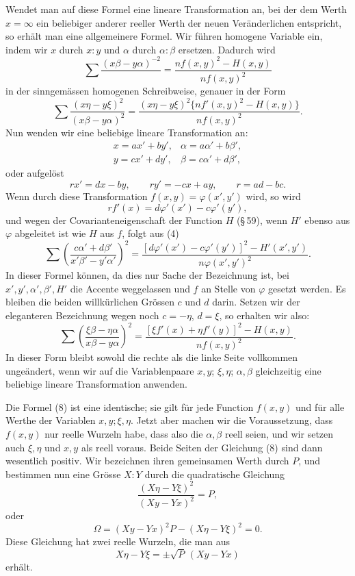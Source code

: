 \documentclass[11pt]{article}
\begin{document}
Wendet man auf diese Formel eine lineare Transformation an, bei der dem Werth $x=\infty$ ein beliebiger anderer reeller Werth der neuen Veränderlichen entspricht, so erhält man eine allgemeinere Formel. Wir führen homogene Variable ein, indem wir $x$ durch $x:y$ und $\alpha$ durch $\alpha:\beta$ ersetzen. Dadurch wird
\begin{equation}
        \sum \frac{(x\beta-y\alpha)^{-2}}{\ }=
        \frac{n f(x,y)^2-H(x,y)}{n f(x,y)^2}
\tag{4}
\end{equation}
in der sinngemässen homogenen Schreibweise, genauer in der Form
\[
        \sum \frac{(x\eta-y\xi)^2}{(x\beta-y\alpha)^2}
        =
        \frac{(x\eta-y\xi)^2\{n f'(x,y)^2-H(x,y)\}}{n f(x,y)^2}.
\]
Nun wenden wir eine beliebige lineare Transformation an:
\begin{equation}
\begin{array}{ll}
x=ax'+by',& \alpha=a\alpha'+b\beta',\\
y=cx'+dy',& \beta=c\alpha'+d\beta',
\end{array}
\tag{5}
\end{equation}
oder aufgelöst
\[
        rx'=dx-by,\qquad ry'=-cx+ay,\qquad r=ad-bc.
\]
Wenn durch diese Transformation $f(x,y)=\varphi(x',y')$ wird, so wird
\[
        r f'(x)=d\varphi'(x')-c\varphi'(y'),
\]
und wegen der Covarianteneigenschaft der Function $H$ (\S\,59), wenn $H'$ ebenso aus $\varphi$ abgeleitet ist wie $H$ aus $f$, folgt aus (4)
\[
 \sum\left(
        \frac{c\alpha'+d\beta'}{x'\beta'-y'\alpha'}
      \right)^2
 =
 \frac{[d\varphi'(x')-c\varphi'(y')]^2-H'(x',y')}{n\varphi(x',y')^2}.
\tag{6}
\]
In dieser Formel können, da dies nur Sache der Bezeichnung ist, bei $x',y',\alpha',\beta',H'$ die Accente weggelassen und $f$ an Stelle von $\varphi$ gesetzt werden. Es bleiben die beiden willkürlichen Grössen $c$ und $d$ darin. Setzen wir der eleganteren Bezeichnung wegen noch $c=-\eta$, $d=\xi$, so erhalten wir also:
\begin{equation}
        \sum\left(
        \frac{\xi\beta-\eta\alpha}{x\beta-y\alpha}
        \right)^2
        =
        \frac{[\xi f'(x)+\eta f'(y)]^2-H(x,y)}{n f(x,y)^2}.
\tag{8}
\end{equation}
In dieser Form bleibt sowohl die rechte als die linke Seite vollkommen ungeändert, wenn wir auf die Variablenpaare $x,y$; $\xi,\eta$; $\alpha,\beta$ gleichzeitig eine beliebige lineare Transformation anwenden.

Die Formel (8) ist eine identische; sie gilt für jede Function $f(x,y)$ und für alle Werthe der Variablen $x,y;\xi,\eta$. Jetzt aber machen wir die Voraussetzung, dass $f(x,y)$ nur reelle Wurzeln habe, dass also die $\alpha,\beta$ reell seien, und wir setzen auch $\xi,\eta$ und $x,y$ als reell voraus. Beide Seiten der Gleichung (8) sind dann wesentlich positiv. Wir bezeichnen ihren gemeinsamen Werth durch $P$, und bestimmen nun eine Grösse $X:Y$ durch die quadratische Gleichung
\[
        \frac{(X\eta-Y\xi)^2}{(Xy-Yx)^2}=P,
\]
oder
\begin{equation}
        \Omega=(Xy-Yx)^2P-(X\eta-Y\xi)^2=0.
\tag{9}
\end{equation}
Diese Gleichung hat zwei reelle Wurzeln, die man aus
\[
        X\eta-Y\xi=\pm\sqrt{P}\,(Xy-Yx)
\]
erhält.
\end{document}
